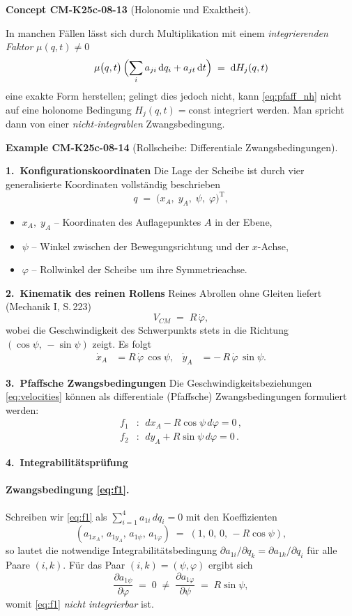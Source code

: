 \documentclass[10pt, letterpaper]{article}
\newcommand{\CustomHeading}[3]{%
  \par\medskip\noindent%
  \textbf{#1 #2} \textnormal{(#3)}.\enskip%
}
\newenvironment{EXA}[2]{\CustomHeading{Example}{#1}{#2}}{}
\newenvironment{CONC}[2]{\CustomHeading{Concept}{#1}{#2}}{}
\begin{document}
\begin{CONC}{CM-K25c-08-13}{Holonomie und Exaktheit}
In manchen Fällen lässt sich durch Multiplikation mit einem
\emph{integrierenden Faktor} $\mu(q,t)\neq 0$
\[
  \mu\bigl(q,t\bigr)\,
  \Bigl(\sum_{i} a_{ji}\,\mathrm dq_i + a_{jt}\,\mathrm dt\Bigr)
  \;=\;
  \mathrm d H_j(q,t)
\]
eine exakte Form herstellen; gelingt dies jedoch nicht, kann
\eqref{eq:pfaff_nh} nicht auf eine holonome Bedingung
$H_j(q,t)=\text{const}$ integriert werden. Man spricht dann von einer
\emph{nicht-integrablen} Zwangsbedingung.
\end{CONC}

\begin{EXA}{CM-K25c-08-14}{Rollscheibe: Differentiale Zwangsbedingungen}
\textbf{1.\ Konfigurationskoordinaten}
Die Lage der Scheibe ist durch vier generalisierte Koordinaten vollständig
beschrieben
\[
  q \;=\; \bigl(x_A,\;y_A,\;\psi,\;\varphi\bigr)^{\mathrm T},
\]
\begin{itemize}
  \item $x_A,\;y_A$ – Koordinaten des Auflagepunktes $A$ in der Ebene,
  \item $\psi$ – Winkel zwischen der Bewegungsrichtung und der $x$-Achse,
  \item $\varphi$ – Rollwinkel der Scheibe um ihre Symmetrieachse.
\end{itemize}

\textbf{2.\ Kinematik des reinen Rollens}
Reines Abrollen ohne Gleiten liefert (Mechanik I, S.\,223)
\[
  V_{CM} \;=\; R\,\dot{\varphi},
\]
wobei die Geschwindigkeit des Schwerpunkts stets in die
Richtung $(\cos\psi,\,-\sin\psi)$ zeigt. Es folgt
\begin{align}
  \dot{x}_A &= R\,\dot{\varphi}\,\cos\psi,
  &
  \dot{y}_A &= -\,R\,\dot{\varphi}\,\sin\psi.
  \label{eq:velocities}
\end{align}

\textbf{3.\ Pfaffsche Zwangsbedingungen}
Die Geschwindigkeitsbeziehungen \eqref{eq:velocities} können als
differentiale (Pfaffsche) Zwangsbedingungen formuliert werden:
\begin{align}
  f_1 &:\; \boxed{\,dx_A - R\cos\psi\,d\varphi = 0\,},
  \label{eq:f1}\\[2mm]
  f_2 &:\; \boxed{\,dy_A + R\sin\psi\,d\varphi = 0\,}.
  \label{eq:f2}
\end{align}

\textbf{4.\ Integrabilitätsprüfung}

\paragraph{Zwangsbedingung \eqref{eq:f1}.}
Schreiben wir \eqref{eq:f1} als
\(
  \sum_{i=1}^{4} a_{1i}\,dq_i = 0
\)
mit den Koeffizienten
\[
  (a_{1x_A},\,a_{1y_A},\,a_{1\psi},\,a_{1\varphi})
  \;=\;
  (1,\,0,\,0,\,-R\cos\psi),
\]
so lautet die notwendige Integrabilitätsbedingung
\(
  \partial a_{1i}/\partial q_k
  =
  \partial a_{1k}/\partial q_i
\)
für alle Paare $(i,k)$.  
Für das Paar $(i,k)=(\psi,\varphi)$ ergibt sich
\[
  \frac{\partial a_{1\psi}}{\partial\varphi}
  \;=\; 0
  \;\neq\;
  \frac{\partial a_{1\varphi}}{\partial\psi}
  \;=\;
  R\sin\psi,
\]
womit \eqref{eq:f1} \emph{nicht integrierbar} ist.


\end{EXA}
\end{document}
